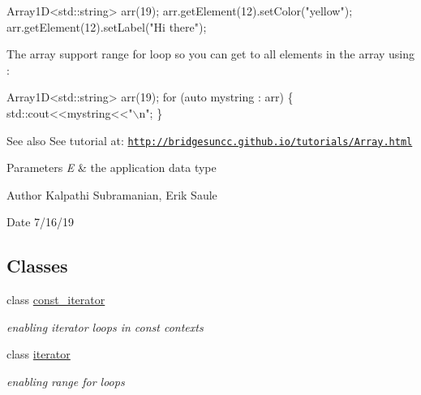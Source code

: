 \begin{DoxyCode}
Array1D<std::string> arr(19);
arr.getElement(12).setColor(\textcolor{stringliteral}{"yellow"});
arr.getElement(12).setLabel(\textcolor{stringliteral}{"Hi there"});
\end{DoxyCode}


The array support range for loop so you can get to all elements in the array using \+:


\begin{DoxyCode}
Array1D<std::string> arr(19);
\textcolor{keywordflow}{for} (\textcolor{keyword}{auto} mystring : arr) \{
  std::cout<<mystring<<\textcolor{stringliteral}{"\(\backslash\)n"};
\}
\end{DoxyCode}


\begin{DoxySeeAlso}{See also}
See tutorial at\+: \href{http://bridgesuncc.github.io/tutorials/Array.html}{\tt http\+://bridgesuncc.\+github.\+io/tutorials/\+Array.\+html}
\end{DoxySeeAlso}

\begin{DoxyParams}{Parameters}
{\em E} & the application data type \\
\hline
\end{DoxyParams}
\begin{DoxyAuthor}{Author}
Kalpathi Subramanian, Erik Saule 
\end{DoxyAuthor}
\begin{DoxyDate}{Date}
7/16/19 
\end{DoxyDate}
\subsection*{Classes}
\begin{DoxyCompactItemize}
\item 
class \hyperlink{classbridges_1_1datastructure_1_1_array1_d_1_1const__iterator}{const\+\_\+iterator}
\begin{DoxyCompactList}\small\item\em enabling iterator loops in const contexts \end{DoxyCompactList}\item 
class \hyperlink{classbridges_1_1datastructure_1_1_array1_d_1_1iterator}{iterator}
\begin{DoxyCompactList}\small\item\em enabling range for loops \end{DoxyCompactList}\end{DoxyCompactItemize}
